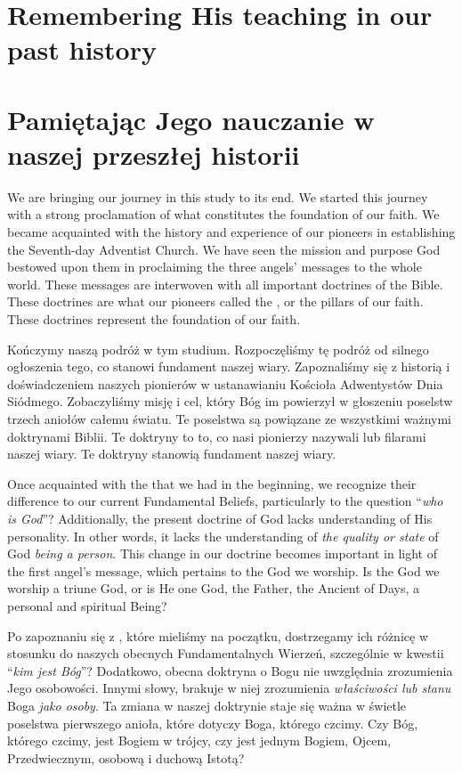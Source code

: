 \chapter{Remembering His teaching in our past history}


\chapter{Pamiętając Jego nauczanie w naszej przeszłej historii}


We are bringing our journey in this study to its end. We started this journey with a strong proclamation of what constitutes the foundation of our faith. We became acquainted with the history and experience of our pioneers in establishing the Seventh-day Adventist Church. We have seen the mission and purpose God bestowed upon them in proclaiming the three angels’ messages to the whole world. These messages are interwoven with all important doctrines of the Bible. These doctrines are what our pioneers called the , or the pillars of our faith. These doctrines represent the foundation of our faith.


Kończymy naszą podróż w tym studium. Rozpoczęliśmy tę podróż od silnego ogłoszenia tego, co stanowi fundament naszej wiary. Zapoznaliśmy się z historią i doświadczeniem naszych pionierów w ustanawianiu Kościoła Adwentystów Dnia Siódmego. Zobaczyliśmy misję i cel, który Bóg im powierzył w głoszeniu poselstw trzech aniołów całemu światu. Te poselstwa są powiązane ze wszystkimi ważnymi doktrynami Biblii. Te doktryny to to, co nasi pionierzy nazywali  lub filarami naszej wiary. Te doktryny stanowią fundament naszej wiary.


Once acquainted with the  that we had in the beginning, we recognize their difference to our current Fundamental Beliefs, particularly to the question “\textit{who is God}”? Additionally, the present doctrine of God lacks understanding of His personality. In other words, it lacks the understanding of \textit{the quality or state} of God \textit{being a person}. This change in our doctrine becomes important in light of the first angel’s message, which pertains to the God we worship. Is the God we worship a triune God, or is He one God, the Father, the Ancient of Days, a personal and spiritual Being?


Po zapoznaniu się z , które mieliśmy na początku, dostrzegamy ich różnicę w stosunku do naszych obecnych Fundamentalnych Wierzeń, szczególnie w kwestii “\textit{kim jest Bóg}”? Dodatkowo, obecna doktryna o Bogu nie uwzględnia zrozumienia Jego osobowości. Innymi słowy, brakuje w niej zrozumienia \textit{właściwości lub stanu} Boga \textit{jako osoby}. Ta zmiana w naszej doktrynie staje się ważna w świetle poselstwa pierwszego anioła, które dotyczy Boga, którego czcimy. Czy Bóg, którego czcimy, jest Bogiem w trójcy, czy jest jednym Bogiem, Ojcem, Przedwiecznym, osobową i duchową Istotą?


